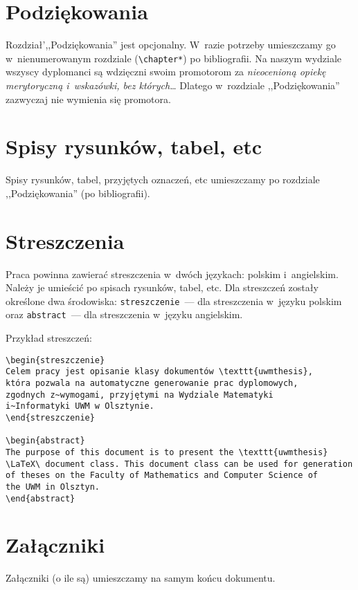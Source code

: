 \section{Podziękowania}
Rozdział',,Podziękowania'' jest opcjonalny. 
W~razie potrzeby umieszczamy go w~nienumerowanym rozdziale (\verb|\chapter*|) po bibliografii. Na naszym wydziale wszyscy dyplomanci są wdzięczni swoim promotorom za \emph{nieocenioną opiekę merytoryczną i~wskazówki, bez których\dots} Dlatego w~rozdziale ,,Podziękowania'' zazwyczaj nie wymienia się promotora.

\section{Spisy rysunków, tabel, etc}
Spisy rysunków, tabel, przyjętych oznaczeń, etc umieszczamy po rozdziale ,,Podziękowania'' (po bibliografii).

\section{Streszczenia}
Praca powinna zawierać streszczenia w~dwóch językach: polskim i~angielskim.  Należy je umieścić po spisach rysunków, tabel, etc. Dla streszczeń zostały określone dwa środowiska: \texttt{streszczenie}~--- dla streszczenia w~języku polskim oraz \texttt{abstract}~--- dla streszczenia w~języku angielskim.

Przykład streszczeń:
\begin{verbatim}
\begin{streszczenie}
Celem pracy jest opisanie klasy dokumentów \texttt{uwmthesis},
która pozwala na automatyczne generowanie prac dyplomowych,
zgodnych z~wymogami, przyjętymi na Wydziale Matematyki
i~Informatyki UWM w Olsztynie.
\end{streszczenie}

\begin{abstract}
The purpose of this document is to present the \texttt{uwmthesis}
\LaTeX\ document class. This document class can be used for generation
of theses on the Faculty of Mathematics and Computer Science of
the UWM in Olsztyn.
\end{abstract}
\end{verbatim}


\section{Załączniki}
Załączniki (o ile są) umieszczamy na samym końcu dokumentu.

